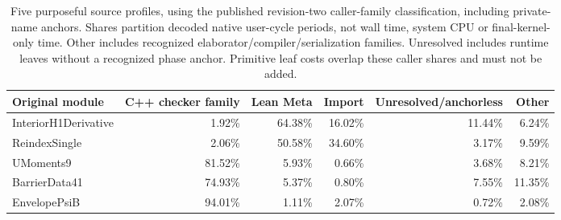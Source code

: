 \begin{table}[t]
\centering\small
\begin{tabular}{lrrrrr}
\toprule
Original module & C++ checker family & Lean Meta & Import &
Unresolved/anchorless & Other\\
\midrule
InteriorH1Derivative & 1.92\% & 64.38\% & 16.02\% & 11.44\% & 6.24\%\\
ReindexSingle & 2.06\% & 50.58\% & 34.60\% & 3.17\% & 9.59\%\\
UMoments9 & 81.52\% & 5.93\% & 0.66\% & 3.68\% & 8.21\%\\
BarrierData41 & 74.93\% & 5.37\% & 0.80\% & 7.55\% & 11.35\%\\
EnvelopePsiB & 94.01\% & 1.11\% & 2.07\% & 0.72\% & 2.08\%\\
\bottomrule
\end{tabular}
\caption{Five purposeful source profiles, using the published revision-two
caller-family classification, including private-name anchors. Shares partition decoded native user-cycle
periods, not wall time, system CPU or final-kernel-only time.
Other includes recognized elaborator/compiler/serialization families.
Unresolved includes runtime leaves without a recognized phase anchor.
Primitive leaf costs overlap these caller shares and must not be added.}
\label{tab:native-phase-panel}
\end{table}